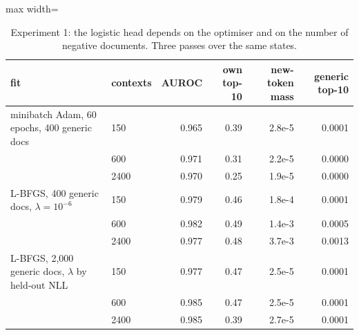 \begin{table}[t]
\centering
\footnotesize
\caption{Experiment 1: the logistic head depends on the optimiser and on the number of negative documents. Three passes over the same states.}
\label{tab:e1_lr_ablation}
\begin{adjustbox}{max width=\textwidth}
\begin{tabular}{llrrrr}
\toprule
fit & contexts & AUROC & own top-10 & new-token mass & generic top-10 \\
\midrule
minibatch Adam, 60 epochs, 400 generic docs & 150 & 0.965 & 0.39 & 2.8e-5 & 0.0001 \\
 & 600 & 0.971 & 0.31 & 2.2e-5 & 0.0000 \\
 & 2400 & 0.970 & 0.25 & 1.9e-5 & 0.0000 \\
\midrule
L-BFGS, 400 generic docs, $\lambda{=}10^{-6}$ & 150 & 0.979 & 0.46 & 1.8e-4 & 0.0001 \\
 & 600 & 0.982 & 0.49 & 1.4e-3 & 0.0005 \\
 & 2400 & 0.977 & 0.48 & 3.7e-3 & 0.0013 \\
\midrule
L-BFGS, 2{,}000 generic docs, $\lambda$ by held-out NLL & 150 & 0.977 & 0.47 & 2.5e-5 & 0.0001 \\
 & 600 & 0.985 & 0.47 & 2.5e-5 & 0.0001 \\
 & 2400 & 0.985 & 0.39 & 2.7e-5 & 0.0001 \\
\bottomrule
\end{tabular}
\end{adjustbox}
\end{table}